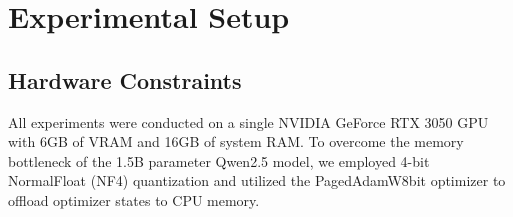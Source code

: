 %






\section{Experimental Setup}
\subsection{Hardware Constraints}
All experiments were conducted on a single NVIDIA GeForce RTX 3050 GPU with 6GB of VRAM and 16GB of system RAM. To overcome the memory bottleneck of the 1.5B parameter Qwen2.5 model, we employed 4-bit NormalFloat (NF4) quantization \cite{dettmers2024qlora} and utilized the PagedAdamW8bit optimizer to offload optimizer states to CPU memory.

